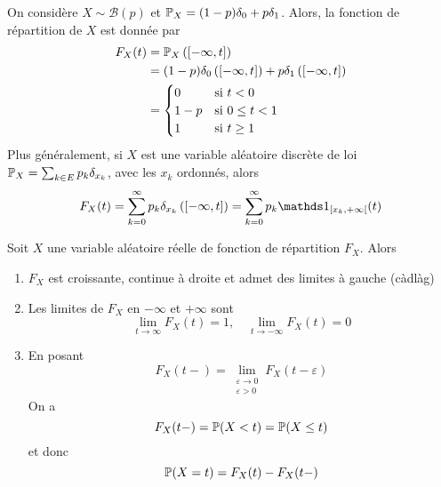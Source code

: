 \begin{example}
    On considère \(X\sim\mathcal B(p)\) et \(\mathbb{P}_X = (1-p)\delta_0 + p\delta_1\).
    Alors, la fonction de répartition de \(X\) est donnée par
    \begin{equation*}
        \begin{aligned}
            F_X(t) 
            &= \mathbb{P}_X\left(\mathopen{}\left[-\infty,t\right]\mathclose{}\right)\\
            &= (1-p)\delta_0\left(\mathopen{}\left[-\infty,t\right]\mathclose{}\right) + p\delta_1\left(\mathopen{}\left[-\infty,t\right]\mathclose{}\right)\\
            &= \begin{cases}
                0 & \text{si } t<0\\
                1-p & \text{si } 0\leq t<1\\
                1 & \text{si } t\geq 1
            \end{cases}
        \end{aligned}
    \end{equation*}
    Plus généralement, si \(X\) est une variable aléatoire discrète de loi \(\mathbb{P}_X = \sum_{k\in E}p_k\delta_{x_k}\), avec
    les \(x_k\) ordonnés, alors
    \begin{equation*}
        F_X(t) = \sum_{k=0}^{\infty} p_k\delta_{x_k}\left(\ff{-\infty,t}\right) = \sum_{k=0}^{\infty} p_k\one_{\fo{x_k,+\infty}}(t)
    \end{equation*}
\end{example}

\begin{proposition}
    Soit \(X\) une variable aléatoire réelle de fonction de répartition \(F_X\). Alors
    \begin{enumerate}
        \item \(F_X\) est croissante, continue à droite et admet des limites à gauche (càdlàg)
        \item Les limites de \(F_X\) en \(-\infty\) et \(+\infty\) sont
        \begin{equation*}
            \lim_{t\to\infty} F_X(t) = 1,\quad \lim_{t\to-\infty} F_X(t) = 0
        \end{equation*}
        \item En posant
        \begin{equation*}
            F_X(t-) = \lim_{\substack{\varepsilon\to 0\\ \varepsilon>0} } F_X(t-\varepsilon)
        \end{equation*}
        On a
        \begin{equation*}
            F_X(t-) = \mathbb{P}(X<t) = \mathbb{P}(X\leq t)
        \end{equation*}
        et donc
        \begin{equation*}
            \mathbb{P}(X=t) = F_X(t) - F_X(t-)
        \end{equation*}
    \end{enumerate}
\end{proposition}

